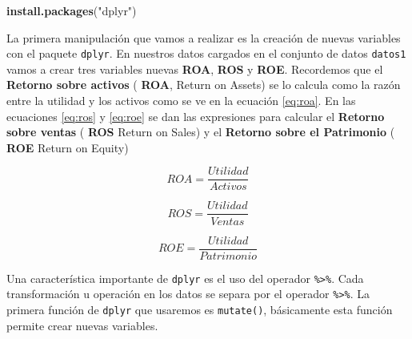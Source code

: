 \documentclass[]{book}
\newenvironment{Shaded}{\begin{snugshade}}{\end{snugshade}}
\newcommand{\KeywordTok}[1]{\textcolor[rgb]{0.13,0.29,0.53}{\textbf{#1}}}
\newcommand{\DataTypeTok}[1]{\textcolor[rgb]{0.13,0.29,0.53}{#1}}
\newcommand{\StringTok}[1]{\textcolor[rgb]{0.31,0.60,0.02}{#1}}
\newcommand{\OperatorTok}[1]{\textcolor[rgb]{0.81,0.36,0.00}{\textbf{#1}}}
\newcommand{\NormalTok}[1]{#1}
\begin{document}
\begin{Shaded}
\begin{Highlighting}[]
\KeywordTok{install.packages}\NormalTok{(}\StringTok{"dplyr"}\NormalTok{)}
\end{Highlighting}
\end{Shaded}

La primera manipulación que vamos a realizar es la creación de nuevas
variables con el paquete \texttt{dplyr}. En nuestros datos cargados en
el conjunto de datos \texttt{datos1} vamos a crear tres variables nuevas
\textbf{ROA}, \textbf{ROS} y \textbf{ROE}. Recordemos que el
\textbf{Retorno sobre activos} ( \textbf{ROA}, Return on Assets) se lo
calcula como la razón entre la utilidad y los activos como se ve en la
ecuación \eqref{eq:roa}. En las ecuaciones \eqref{eq:ros} y \eqref{eq:roe} se
dan las expresiones para calcular el \textbf{Retorno sobre ventas} (
\textbf{ROS} Return on Sales) y el \textbf{Retorno sobre el Patrimonio}
( \textbf{ROE} Return on Equity)

\begin{equation} 
  ROA = \dfrac{Utilidad}{Activos}
  \label{eq:roa}
\end{equation}

\begin{equation} 
  ROS = \dfrac{Utilidad}{Ventas}
  \label{eq:ros}
\end{equation}

\begin{equation} 
  ROE = \dfrac{Utilidad}{Patrimonio}
  \label{eq:roe}
\end{equation}

Una característica importante de \texttt{dplyr} es el uso del operador
\texttt{\%\textgreater{}\%}. Cada transformación u operación en los
datos se separa por el operador \texttt{\%\textgreater{}\%}. La primera
función de \texttt{dplyr} que usaremos es \texttt{mutate()}, básicamente
esta función permite crear nuevas variables.

\begin{Shaded}
\end{Shaded}
\end{document}
